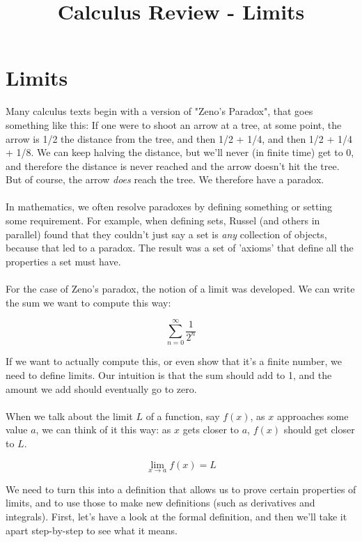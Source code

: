 \documentclass[12pt,a4paper]{article} %
\title{Calculus Review - Limits}
\begin{document}
\maketitle

\section{Limits} 
Many calculus texts begin with a version of "Zeno's Paradox", that goes something like this: If one were to shoot an arrow at a tree, at some point, the arrow is 1/2 the distance from the tree, and then 1/2 + 1/4, and then 1/2 + 1/4 + 1/8. We can keep halving the distance, but we'll never (in finite time) get to 0, and therefore the distance is never reached and the arrow doesn't hit the tree. But of course, the arrow \emph{does} reach the tree. We therefore have a paradox.\\\\

In mathematics, we often resolve paradoxes by defining something or setting some requirement. For example, when defining sets, Russel (and others in parallel) found that they couldn't just say a set is \emph{any} collection of objects, because that led to a paradox. The result was a set of 'axioms' that define all the properties a set must have.\\\\

For the case of Zeno's paradox, the notion of a limit was developed. We can write the sum we want to compute this way:

$$\sum\limits_{n=0}^\infty \frac1{2^n}$$

\vspace{0.2in}
If we want to actually compute this, or even show that it's a finite number, we need to define limits. Our intuition is that the sum should add to 1, and the amount we add should eventually go to zero. \\\\
When we talk about the limit $L$ of a function, say $f(x)$, as $x$ approaches some value $a$, we can think of it this way: as $x$ gets closer to $a$, $f(x)$ should get closer to $L$.

$$\lim\limits_{x\rightarrow a} f(x) = L$$

We need to turn this into a definition that allows us to prove certain properties of limits, and to use those to make new definitions (such as derivatives and integrals). First, let's have a look at the formal definition, and then we'll take it apart step-by-step to see what it means.
\end{document}
